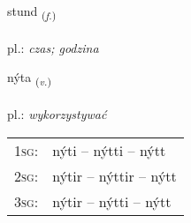 \documentclass[frontgrid, backgrid]{flacards}\usepackage[]{graphicx}\usepackage[]{xcolor}
\begin{document}
\renewcommand{\flhead}{\vskip5pt \fboxsep=0pt {\small\bfseries\footnotesize Nafnorð | rzeczownik}}
\renewcommand{\fcfoot}{\vskip5pt \fboxsep=0pt \hspace{2pt}{\small\bfseries\footnotesize 1K}}

\renewcommand{\blhead}{\vskip5pt {\small\bfseries\footnotesize Nafnorð | rzeczownik }}
\renewcommand{\bcfoot}{\vskip5pt \hspace{2pt}{\small\bfseries\footnotesize 1K}}


{stund \small{\textsubscript{(\textit{f.})}} \\[1ex] %
\textphonetic{[stʏnt]} \\
pl.: \emph{czas; godzina} \\  [2ex]
\renewcommand*{\arraystretch}{0.8}
}

\renewcommand{\flhead}{\vskip5pt \fboxsep=0pt {\small\bfseries\footnotesize Sagnorð | czasownik}}
\renewcommand{\fcfoot}{\vskip5pt \fboxsep=0pt \hspace{2pt}{\small\bfseries\footnotesize 1K}}

\renewcommand{\blhead}{\vskip5pt {\small\bfseries\footnotesize Sagnorð | czasownik }}
\renewcommand{\bcfoot}{\vskip5pt \hspace{2pt}{\small\bfseries\footnotesize 1K}}


{nýta \small{\textsubscript{(\textit{v.})}} \\[1ex] %
\textphonetic{[niːta]} \\
pl.: \emph{wykorzystywać} \\  [2ex]
\renewcommand*{\arraystretch}{0.8}
\begin{tabular}{p{1cm}l}
\textsc{1sg}: & nýti -- nýtti -- nýtt \\ 
\textsc{2sg}: & nýtir -- nýttir -- nýtt \\ 
\textsc{3sg}: & nýtir -- nýtti -- nýtt \\ 
\end{tabular}
}
\end{document}
